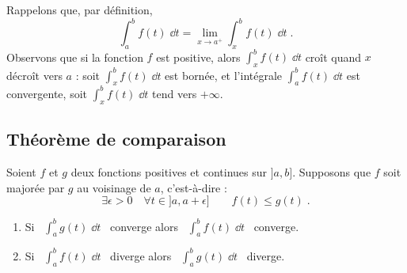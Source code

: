 \documentclass[class=report,crop=false]{standalone}
\begin{document}

Rappelons que, par définition,
$$\int_a^b f(t)\;\dd t = \lim_{x\rightarrow a^+} \int_x^b f(t)\;\dd t\;.$$
Observons que si la fonction $f$ est positive, alors 
$\int_x^b f(t)\;\dd t$ croît quand $x$ décroît vers $a$ : 
soit $\int_x^b f(t)\;\dd t$ est bornée, et l'intégrale $\int_a^b
f(t)\;\dd t$ est convergente, soit $\int_x^b f(t)\;\dd t$ tend vers
$+\infty$. 

\subsection{Théorème de comparaison}


\begin{theoreme}
\label{th:comparaisonintegrales2}
Soient $f$ et $g$ deux fonctions positives et continues sur $]a,b]$. 
Supposons que $f$ soit majorée par $g$ au voisinage de $a$, c'est-à-dire :
$$\exists \epsilon>0 \quad \forall t\in ]a,a+\epsilon] \qquad f(t)\le g(t)\;.$$
\begin{enumerate}
  \item Si \  $\int_a^b g(t)\;\dd t$ \  converge alors \  $\int_a^b f(t)\;\dd t$ \  converge.
  \item Si \  $\int_a^b f(t)\;\dd t$ \  diverge alors \  $\int_a^b g(t)\;\dd t$ \  diverge.
\end{enumerate}
\end{theoreme}
\end{document}
